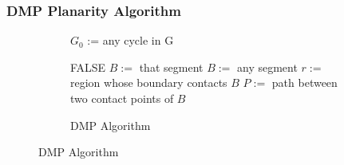 \documentclass{beamer}
\begin{document}
    \frame
    {
        \frametitle{DMP Planarity Algorithm}
        \begin{figure}
            \centering
            \SetCustomAlgoRuledWidth{5.5cm}
            \tiny
            \begin{subfigure}[h]{5.5cm} 
                \begin{algorithm}[H]
                    \NoCaptionOfAlgo
                    \DontPrintSemicolon
                        $G_0$ := any cycle in G \;
                        
                        {
                            {
                                \Return FALSE \;
                            }
                            {
                                $B :=$ that segment \;
                            }
                            \Else
                            {
                                $B :=$ any segment \;
                            }
                            $r :=$ region whose boundary contacts $B$ \;
                            $P :=$ path between two contact points of $B$ \;
                        }
                    
                    \caption{\tiny DMP Algorithm}
                \end{algorithm}
            \end{subfigure}
        \end{figure}
        \vfill
    }
    
\end{document}
